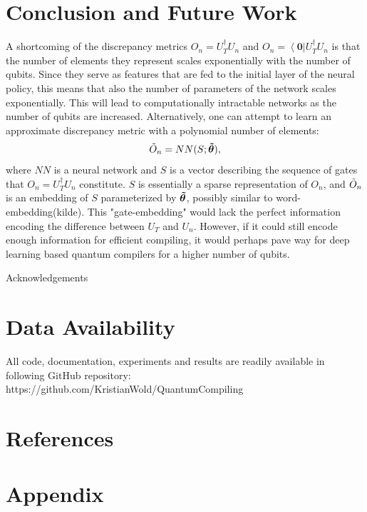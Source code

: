 \documentclass[%
 aip,
 floatfix,
 amsmath,amssymb,
 reprint,%
]{revtex4-1}
\newcommand{\bra}[1]{{\left\langle  #1 \right|}}
\begin{document}
\section{Conclusion and Future Work \label{sec:6}}
A shortcoming of the discrepancy metrics $O_n = U_T^{\dagger}U_n$ and $O_n = \bra{\boldsymbol{0}}U_T^{\dagger}U_n$ is that the number of elements they represent scales exponentially with the number of qubits. Since they serve as features that are fed to the initial layer of the neural policy, this means that also the number of parameters of the network scales exponentially. This will lead to computationally intractable networks as the number of qubits are increased. Alternatively, one can attempt to learn an approximate discrepancy metric with a polynomial number of elements: 
\begin{equation}
    \Tilde{O}_n = NN(S;\boldsymbol{\Tilde{\theta}}),
\end{equation} 
where $NN$ is a neural network and $S$ is a vector describing the sequence of gates that $O_n = U_T^{\dagger}U_n$ constitute. $S$ is essentially a sparse representation of $O_n$, and $\Tilde{O}_n$ is an embedding of $S$ parameterized by $\boldsymbol{\Tilde{\theta}}$, possibly similar to word-embedding(kilde). This "gate-embedding" would lack the perfect information encoding the difference between $U_T$ and $U_n$. However, if it could still encode enough information for efficient compiling, it would perhaps pave way for deep learning based quantum compilers for a higher number of qubits.



\begin{acknowledgments}
Acknowledgements
\end{acknowledgments}

\section*{Data Availability}
All code, documentation, experiments and results are readily available in following GitHub repository:
https://github.com/KristianWold/QuantumCompiling
\section*{References}


\section*{Appendix}
\end{document}

